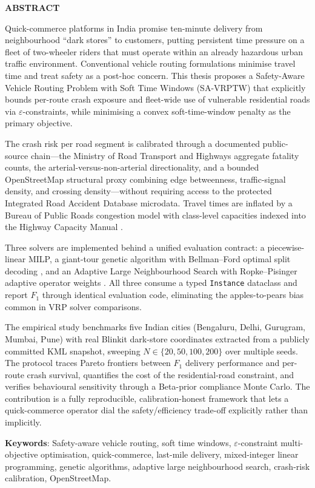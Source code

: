 \thispagestyle{plain}
\begin{center}
    \Large \textbf{\uppercase{Abstract}}
\end{center}

\vspace{2\baselineskip}

\noindent
Quick-commerce platforms in India promise ten-minute delivery from
neighbourhood ``dark stores'' to customers, putting persistent time
pressure on a fleet of two-wheeler riders that must operate within an
already hazardous urban traffic environment. Conventional vehicle
routing formulations minimise travel time and treat safety as a
post-hoc concern. This thesis proposes a Safety-Aware Vehicle Routing
Problem with Soft Time Windows (SA-VRPTW) that explicitly bounds
per-route crash exposure and fleet-wide use of vulnerable residential
roads via $\varepsilon$-constraints, while minimising a convex
soft-time-window penalty as the primary objective.

The crash risk per road segment is calibrated through a documented
public-source chain---the Ministry of Road Transport and Highways
\citep{morth2022} aggregate fatality counts, the
\citet{mohan2017} arterial-versus-non-arterial directionality, and a
bounded OpenStreetMap structural proxy combining edge betweenness,
traffic-signal density, and crossing density---without requiring
access to the protected Integrated Road Accident Database microdata.
Travel times are inflated by a Bureau of Public Roads
\citep{bpr1964} congestion model with class-level capacities indexed
into the Highway Capacity Manual \citep{hcm2010}.

Three solvers are implemented behind a unified evaluation contract:
a piecewise-linear MILP, a giant-tour genetic algorithm with
Bellman--Ford optimal split decoding \citep{prins2004}, and an
Adaptive Large Neighbourhood Search with Ropke--Pisinger adaptive
operator weights \citep{ropke2006}. All three consume a typed
\texttt{Instance} dataclass and report $F_1$ through identical
evaluation code, eliminating the apples-to-pears bias common in VRP
solver comparisons.

The empirical study benchmarks five Indian cities (Bengaluru, Delhi,
Gurugram, Mumbai, Pune) with real Blinkit dark-store coordinates
extracted from a publicly committed KML snapshot, sweeping
$N \in \{20, 50, 100, 200\}$ over multiple seeds. The protocol traces
Pareto frontiers between $F_1$ delivery performance and per-route
crash survival, quantifies the cost of the residential-road
constraint, and verifies behavioural sensitivity through a Beta-prior
compliance Monte Carlo. The contribution is a fully reproducible,
calibration-honest framework that lets a quick-commerce operator dial
the safety/efficiency trade-off explicitly rather than implicitly.

\vspace{\baselineskip}

\noindent
\textbf{Keywords}: Safety-aware vehicle routing, soft time windows,
$\varepsilon$-constraint multi-objective optimisation,
quick-commerce, last-mile delivery, mixed-integer linear programming,
genetic algorithms, adaptive large neighbourhood search, crash-risk
calibration, OpenStreetMap.
